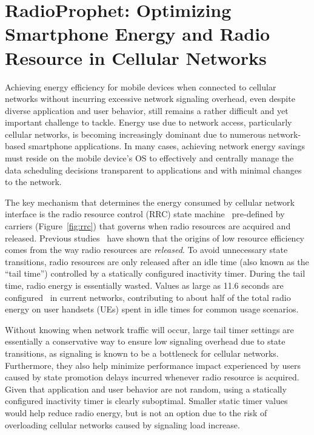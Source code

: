 \chapter{RadioProphet: Optimizing Smartphone Energy and Radio Resource in Cellular Networks}
\label{chap:optimize}

Achieving energy efficiency for mobile devices when connected to cellular networks without incurring excessive network signaling overhead, even despite diverse application and user behavior, still remains a rather difficult and yet important challenge to tackle. Energy use due to network access, particularly cellular networks, is becoming increasingly dominant due to numerous network-based smartphone applications. In many cases, achieving network energy savings must reside on the mobile device's OS to effectively and centrally manage the data scheduling decisions transparent to applications and with minimal changes to the network.

The key mechanism that determines the energy consumed by cellular network interface is the radio resource control (RRC) state machine~\cite{imc.3g} pre-defined by carriers (Figure~\ref{fig:rrc}) that governs when radio resources are acquired and released. Previous studies~\cite{imc.tailender, imc.3g, qian10_icnp, huang_mobisys12} have shown that the origins of low resource efficiency comes from the way radio resources are \emph{released}. To avoid unnecessary state transitions, radio resources are only released after an idle time (also known as the ``tail time'') controlled by a statically configured inactivity timer. During the tail time, radio energy is essentially wasted. Values as large as 11.6 seconds are configured~\cite{huang_mobisys12} in current networks, contributing to about half of the total radio energy on user handsets (UEs) spent in idle times for common usage scenarios.

Without knowing when network traffic will occur, large tail timer settings are essentially a conservative way to ensure low signaling overhead due to state transitions, as signaling is known to be a bottleneck for cellular networks.  Furthermore, they also help minimize performance impact experienced by users caused by state promotion delays incurred whenever radio resource is acquired.
Given that application and user behavior are not random, using a statically configured inactivity timer is clearly suboptimal. Smaller static timer values would help reduce radio energy, but is not an option due to the risk of overloading cellular networks caused by signaling load increase.

